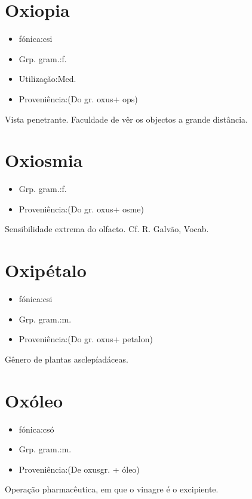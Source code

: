 \section{Oxiopia}
\begin{itemize}
\item {fónica:csi}
\end{itemize}
\begin{itemize}
\item {Grp. gram.:f.}
\end{itemize}
\begin{itemize}
\item {Utilização:Med.}
\end{itemize}
\begin{itemize}
\item {Proveniência:(Do gr. \textunderscore oxus\textunderscore  + \textunderscore ops\textunderscore )}
\end{itemize}
Vista penetrante.
Faculdade de vêr os objectos a grande distância.
\section{Oxiosmia}
\begin{itemize}
\item {Grp. gram.:f.}
\end{itemize}
\begin{itemize}
\item {Proveniência:(Do gr. \textunderscore oxus\textunderscore  + \textunderscore osme\textunderscore )}
\end{itemize}
Sensibilidade extrema do olfacto. Cf. R. Galvão, \textunderscore Vocab.\textunderscore 
\section{Oxipétalo}
\begin{itemize}
\item {fónica:csi}
\end{itemize}
\begin{itemize}
\item {Grp. gram.:m.}
\end{itemize}
\begin{itemize}
\item {Proveniência:(Do gr. \textunderscore oxus\textunderscore  + \textunderscore petalon\textunderscore )}
\end{itemize}
Gênero de plantas asclepíadáceas.
\section{Oxóleo}
\begin{itemize}
\item {fónica:csó}
\end{itemize}
\begin{itemize}
\item {Grp. gram.:m.}
\end{itemize}
\begin{itemize}
\item {Proveniência:(De \textunderscore oxus\textunderscore  gr. + \textunderscore óleo\textunderscore )}
\end{itemize}
Operação pharmacêutica, em que o vinagre é o excipiente.
